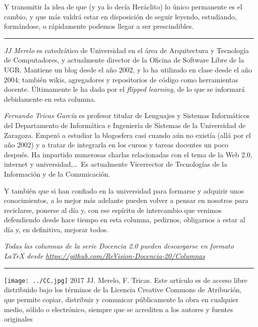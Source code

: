 \documentclass[twoside,10pt]{article}
\newcommand{\surl}[1]{{\small\url{#1}}}
\newcounter{vol}
\newcounter{num}
\begin{document}
\begin{multicols}{2}
	Y transmitir la idea de que (y ya lo decía Heráclito) lo único permanente es el cambio, y que más valdrá estar en disposición de seguir leyendo, estudiando, formándose, o rápidamente podemos llegar a ser prescindibles. 

\noindent\rule{86mm}{1pt}
\vspace{1ex} {\small{\begin{window} 
\noindent\emph{JJ Merelo} es catedrático de Universidad
en el área de Arquitectura y Tecnología de Computadores, y
actualmente director de la Oficina de Software Libre de la UGR.
Mantiene un blog desde el año 2002, y lo ha utilizado en clase desde
el año 2004; también wikis, agregadores y repositorios de código
como herramientas docente. Últimamente le ha dado por el \textsl{flipped
learning}, de lo que se informará debidamente en esta columna.
\end{window}}}

\medskip

{\small{\begin{window}
		\noindent \emph{Fernando Tricas García} es profesor
		titular de Lenguajes y Sistemas Informáticos del Departamento
		de Informática e Ingeniería de Sistemas de la Universidad de
		Zaragoza.  Empezó a estudiar la blogosfera casi cuando aún no
		existía (allá por el año 2002) y a tratar de integrarla en los
		cursos y tareas docentes un poco después.  Ha impartido
		numerosas charlas relacionadas con el tema de la Web 2.0, 
		internet y universidad,\ldots\ 
		Es actualmente Vicerrector de Tecnologías de la Información y
de la Comunicación.   
		\end{window}}}




\noindent 
\bigskip

	Y también que si han confiado en la universidad para formarse y adquirir unos conocimientos, a lo mejor más adelante pueden volver a pensar en nosotros para reciclarse, ponerse al día y, con ese espíritu de intercambio que venimos defendiendo desde hace tiempo en esta columna, pedirnos, obligarnos a estar al día y, en definitiva, mejorar todos.


\noindent\emph{Todas las columnas de la serie Docencia 2.0
pueden descargarse en formato LaTeX desde
\surl{https://github.com/ReVision-Docencia-20/Columnas}}

\noindent\rule{90mm}{1pt}

{\small \noindent\texttt{[image: ../CC.jpg]} 2017 JJ. Merelo, F. Tricas. Este artículo es de acceso libre distribuido bajo los términos
de la Licencia Creative Commons de Atribución, que permite copiar,
distribuir y comunicar públicamente la obra en cualquier medio, sólido
o electrónico, siempre que se acrediten a los autores y fuentes
originales}

\end{multicols}
\end{document}
